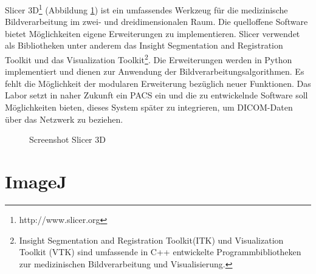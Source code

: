 Slicer 3D\footnote{http://www.slicer.org} (Abbildung \ref{slicer3d}) ist ein umfassendes Werkzeug für die medizinische Bildverarbeitung im zwei- und dreidimensionalen Raum. Die quelloffene Software bietet Möglichkeiten eigene Erweiterungen zu implementieren. Slicer verwendet als Bibliotheken unter anderem das  Insight Segmentation and Registration Toolkit und das Visualization Toolkit\footnote{ Insight Segmentation and Registration Toolkit(ITK) und Visualization Toolkit (VTK) sind umfassende in C++ entwickelte Programmbibliotheken zur medizinischen Bildverarbeitung und Visualisierung.}. Die Erweiterungen werden in Python implementiert und dienen zur Anwendung der Bildverarbeitungsalgorithmen. Es fehlt die Möglichkeit der modularen Erweiterung bezüglich neuer Funktionen. Das Labor setzt in naher Zukunft ein PACS ein und die zu entwickelnde Software soll Möglichkeiten bieten, dieses System später zu integrieren, um DICOM-Daten über das Netzwerk zu beziehen.

\begin{figure}[htbp]
  \vspace{0.5cm}
  \centering
  \caption{Screenshot Slicer 3D \cite{slicer:screen}}
  \label{slicer3d}
  \vspace{0.5cm}
\end{figure}

\section{ImageJ}

